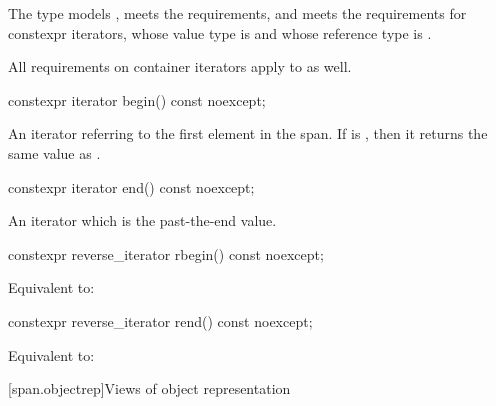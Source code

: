 \begin{itemdescr}
\pnum
The type
models ,
meets the 
requirements,
and
meets the requirements for
constexpr iterators,
whose value type is  and
whose reference type is .

\pnum
All requirements on container iterators apply to
 as well.
\end{itemdescr}

%
\begin{itemdecl}
constexpr iterator begin() const noexcept;
\end{itemdecl}

\begin{itemdescr}
\pnum
\returns
An iterator referring to the first element in the span.
If  is , then it returns the
same value as .
\end{itemdescr}

%
\begin{itemdecl}
constexpr iterator end() const noexcept;
\end{itemdecl}

\begin{itemdescr}
\pnum
\returns
An iterator which is the past-the-end value.
\end{itemdescr}

%
\begin{itemdecl}
constexpr reverse_iterator rbegin() const noexcept;
\end{itemdecl}

\begin{itemdescr}
\pnum
\effects
Equivalent to: 
\end{itemdescr}

%
\begin{itemdecl}
constexpr reverse_iterator rend() const noexcept;
\end{itemdecl}

\begin{itemdescr}
\pnum
\effects
Equivalent to: 
\end{itemdescr}

[span.objectrep]{Views of object representation}

